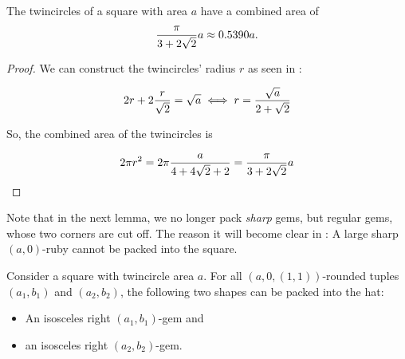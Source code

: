 \documentclass[a4paper,style=print,oneside,bibliography=totoc,nexus,lnum,extramargin]{tubsbook}
\begin{document}
\begin{lemma}\label{th:square-twincircle-area}
    The twincircles of a square with area $a$
    have a combined area of
    $$\frac{\pi}{3+2\sqrt{2}}a \approx 0.5390a.$$
\end{lemma}

\begin{proof}
    We can construct the twincircles' radius $r$ as seen in :

    \begin{equation*}
        2r + 2\frac{r}{\sqrt{2}} = \sqrt{a} \iff r = \frac{\sqrt{a}}{2 + \sqrt{2}}
    \end{equation*}

    So, the combined area of the twincircles is

    $$2\pi r^2 = 2\pi\frac{a}{4 + 4\sqrt{2} + 2} = \frac{\pi}{3+2\sqrt{2}}a$$
\end{proof}


Note that in the next lemma, we no longer pack \emph{sharp} gems, but regular gems, whose two corners are cut off. The reason it will become clear in : A large sharp $(a,0)$-ruby cannot be packed into the square.

\begin{lemma}\label{th:gems-in-square}
    Consider a square with twincircle area $a$.
    For all $(a,0,(1,1))$-rounded tuples $(a_1, b_1)$ and $(a_2, b_2)$, the following two shapes can be packed into the hat:
    \begin{itemize}
        \item An isosceles right $(a_1,b_1)$-gem and
        \item an isosceles right $(a_2,b_2)$-gem.
    \end{itemize}
\end{lemma}
\end{document}

